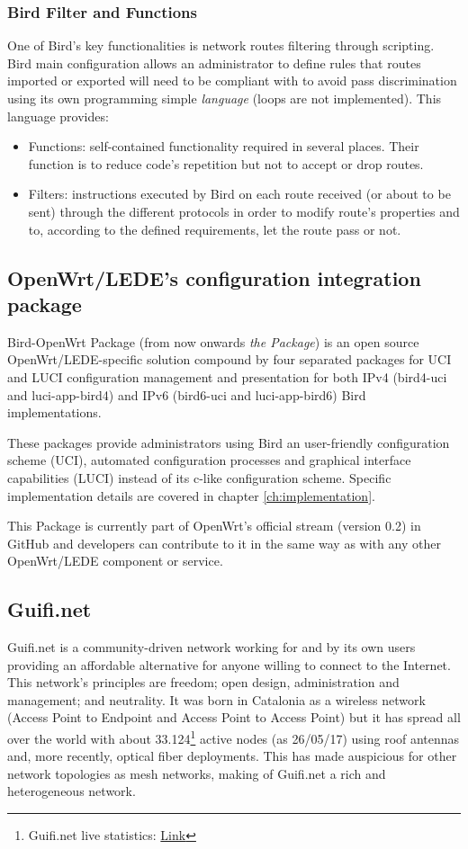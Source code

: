 \subsubsection{Bird Filter and Functions}
\label{sub:sub:filfun}
One of Bird's key functionalities is network routes filtering through scripting. Bird main configuration allows an administrator to define rules that routes imported or exported will need to be compliant with to avoid pass discrimination using its own programming simple \textit{language} (loops are not implemented). This language provides:
\begin{itemize}
    \item Functions: self-contained functionality required in several places. Their function is to reduce code's repetition but not to accept or drop routes.
    \item Filters: instructions executed by Bird on each route received (or about to be sent) through the different protocols in order to modify route's properties and to, according to the defined requirements, let the route pass or not.     
\end{itemize} 

\subsection{OpenWrt/LEDE's configuration integration package}
Bird-OpenWrt Package (from now onwards \textit{the Package}) is an open source OpenWrt/LEDE-specific solution compound by four separated packages for UCI and LUCI configuration management and presentation for both IPv4 (bird4-uci and luci-app-bird4) and IPv6 (bird6-uci and luci-app-bird6) Bird implementations.

These packages provide administrators using Bird an user-friendly configuration scheme (UCI), automated configuration processes and graphical interface capabilities (LUCI) instead of its c-like configuration scheme. Specific implementation details are covered in chapter \ref{ch:implementation}.

This Package is currently part of OpenWrt's official stream (version 0.2) in GitHub and developers can contribute to it in the same way as with any other OpenWrt/LEDE component or service.

\subsection{Guifi.net}
\label{subsec:gn}
Guifi.net is a community-driven network working for and by its own users providing an affordable alternative for anyone willing to connect to the Internet. This network's principles are freedom; open design, administration and management; and neutrality. It was born in Catalonia as a wireless network (Access Point to Endpoint and Access Point to Access Point) but it has spread all over the world with about 33.124\footnote{Guifi.net live statistics: \href{https://guifi.net/guifi/menu/stats/nodes}{Link}} active nodes (as 26/05/17) using roof antennas and, more recently, optical fiber deployments. This has made auspicious for other network topologies as mesh networks, making of Guifi.net a rich and heterogeneous network.

